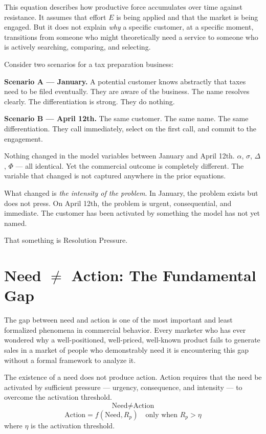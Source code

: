 \documentclass[12pt, openany]{book}
\theoremstyle{thmstyle}
\theoremstyle{defstyle}
\begin{document}
This equation describes how productive force accumulates over time against resistance. It assumes that effort $E$ is being applied and that the market is being engaged. But it does not explain \textit{why} a specific customer, at a specific moment, transitions from someone who might theoretically need a service to someone who is actively searching, comparing, and selecting.

Consider two scenarios for a tax preparation business:

\textbf{Scenario A --- January.} A potential customer knows abstractly that taxes need to be filed eventually. They are aware of the business. The name resolves clearly. The differentiation is strong. They do nothing.

\textbf{Scenario B --- April 12th.} The same customer. The same name. The same differentiation. They call immediately, select on the first call, and commit to the engagement.

Nothing changed in the model variables between January and April 12th. $\alpha$, $\sigma$, $\Delta$, $\Phi$ --- all identical. Yet the commercial outcome is completely different. The variable that changed is not captured anywhere in the prior equations.

What changed is \textit{the intensity of the problem}. In January, the problem exists but does not press. On April 12th, the problem is urgent, consequential, and immediate. The customer has been activated by something the model has not yet named.

That something is Resolution Pressure.

\section{Need $\neq$ Action: The Fundamental Gap}

The gap between need and action is one of the most important and least formalized phenomena in commercial behavior. Every marketer who has ever wondered why a well-positioned, well-priced, well-known product fails to generate sales in a market of people who demonstrably need it is encountering this gap without a formal framework to analyze it.

\begin{keybox}
The existence of a need does not produce action. Action requires that the need be activated by sufficient pressure --- urgency, consequence, and intensity --- to overcome the activation threshold.
\[
\text{Need} \neq \text{Action}
\]
\[
\text{Action} = f(\text{Need}, R_p) \quad \text{only when } R_p > \eta
\]
where $\eta$ is the activation threshold.
\end{keybox}
\end{document}
